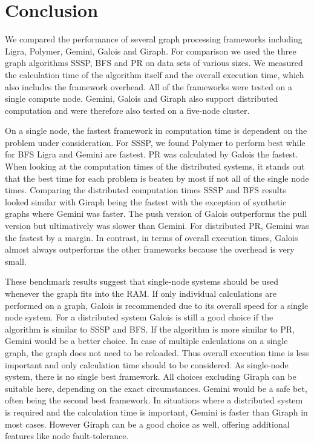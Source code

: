 
\section{Conclusion}

We compared the performance of several graph processing frameworks including Ligra, Polymer, Gemini, Galois and Giraph. 
For comparison we used the three graph algorithms SSSP, BFS and PR on data sets of various sizes.
We measured the calculation time of the algorithm itself and the overall execution time, which also includes the framework overhead.
All of the frameworks were tested on a single compute node. Gemini, Galois and Giraph also support distributed computation and were therefore also tested on a five-node cluster.

On a single node, the fastest framework in computation time is dependent on the problem under consideration.
For SSSP, we found Polymer to perform best while for BFS Ligra and Gemini are fastest. PR was calculated by Galois the fastest.
When looking at the computation times of the distributed systems, it stands out that the best time for each problem is beaten by most if not all of the single node times.
Comparing the distributed computation times SSSP and BFS results looked similar with Giraph being the fastest with the exception of synthetic graphs where Gemini was faster. The push version of Galois outperforms the pull version but ultimatively was slower than Gemini. For distributed PR, Gemini was the fastest by a margin.
In contrast, in terms of overall execution times, Galois almost always outperforms the other frameworks because the overhead is very small.

These benchmark results suggest that single-node systems should be used whenever the graph fits into the RAM. 
If only individual calculations are performed on a graph, Galois is recommended due to its overall speed for a single node system. 
For a distributed system Galois is still a good choice if the algorithm is similar to SSSP and BFS. If the algorithm is more similar to PR, Gemini would be a better choice.
In case of multiple calculations on a single graph, the graph does not need to be reloaded. Thus overall execution time is less important and only calculation time should to be considered.
As single-node system, there is no single best framework. All choices excluding Giraph can be suitable here, depending on the exact circumstances. Gemini would be a safe bet, often being the second best framework. 
In situations where a distributed system is required and the calculation time is important, Gemini is faster than Giraph in most cases.
However Giraph can be a good choice as well, offering additional features like node fault-tolerance.



